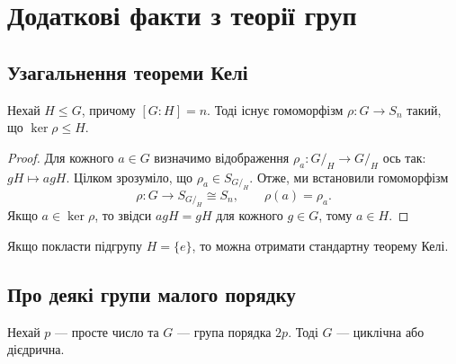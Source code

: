 \documentclass{math_library}
\begin{document}
\section{Додаткові факти з теорії груп}
\subsection{Узагальнення теореми Келі}
\begin{theorem}
Нехай $H \leq G$, причому $[G:H] = n$. Тоді існує гомоморфізм $\rho \colon G \to S_n$ такий, що $\ker \rho \leq H$.
\end{theorem}

\begin{proof}
Для кожного $a \in G$ визначимо відображення $\rho_a \colon G/_H \to G/_H$ ось так: $g H \mapsto agH$. Цілком зрозуміло, що $\rho_a \in S_{G/_H}$. Отже, ми встановили гомоморфізм
\[
\rho \colon G \to S_{G/_H} \cong S_n, \qquad \rho(a) = \rho_a.
\]
Якщо $a \in \ker \rho$, то звідси $agH = gH$ для кожного $g \in G$, тому $a \in H$.
\end{proof}

\begin{remark}
Якщо покласти підгрупу $H = \{e\}$, то можна отримати стандартну теорему Келі.
\end{remark}

\subsection{Про деякі групи малого порядку}
\begin{proposition}
Нехай $p$ --- просте число та $G$ --- група порядка $2p$.
Тоді $G$ --- циклічна або дієдрична.
\end{proposition}
\end{document}

